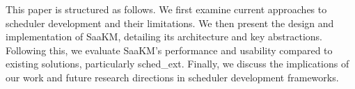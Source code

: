\parspace
This paper is structured as follows. We first examine current approaches to scheduler development and their limitations. We then present the design and implementation of SaaKM, detailing its architecture and key abstractions. Following this, we evaluate SaaKM's performance and usability compared to existing solutions, particularly sched\_ext. Finally, we discuss the implications of our work and future research directions in scheduler development frameworks.